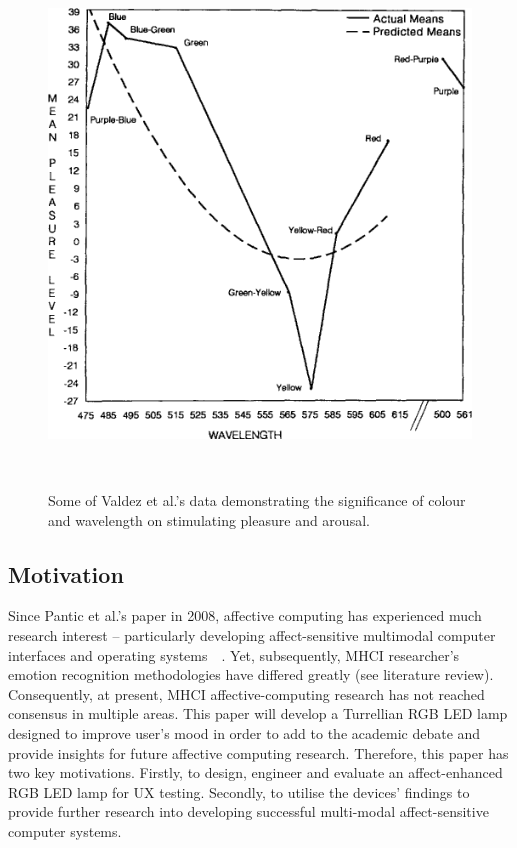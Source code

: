 \documentclass{sigchi}
\begin{document}
\begin{figure}
\centering
  \includegraphics[width=0.9\columnwidth]{figures/Valdez}
  \caption{Some of Valdez et al.'s data demonstrating the significance of colour and wavelength on stimulating pleasure and arousal.}~\cite{valdez1994effects}~\label{fig:figure2}
\end{figure}


\subsection{Motivation}

Since Pantic et al.'s paper in 2008, affective computing has experienced much research interest – particularly developing affect-sensitive multimodal computer interfaces and operating systems~\cite{pantic2008human}~\cite{5771346}. Yet, subsequently, MHCI researcher’s emotion recognition methodologies have differed greatly (see literature review). Consequently, at present, MHCI affective-computing research has not reached consensus in multiple areas. This paper will develop a Turrellian RGB LED lamp designed to improve user’s mood in order to add to the academic debate and provide insights for future affective computing research. Therefore, this paper has two key motivations. Firstly, to design, engineer and evaluate an affect-enhanced RGB LED lamp for UX testing. Secondly, to utilise the devices’ findings to provide further research into developing successful multi-modal affect-sensitive computer systems.
\end{document}

